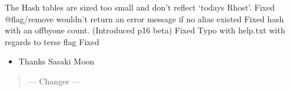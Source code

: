 \documentclass[letterpaper,10pt,english]{sphinxmanual}
\begin{document}
\sphinxAtStartPar
The Hash tables are sized too small and don’t reflect ‘todays Rhost’.  \sphinxhyphen{} Fixed
@flag/remove wouldn’t return an error message if no alias existed \sphinxhyphen{} Fixed
hash with an off\sphinxhyphen{}by\sphinxhyphen{}one count. (Introduced p16 beta) \sphinxhyphen{} Fixed
Typo with help.txt with regards to terse flag \sphinxhyphen{} Fixed
\begin{itemize}
\item {} 
\sphinxAtStartPar
Thanks Sasaki  Moon

\end{itemize}
\begin{quote}

\sphinxAtStartPar
—\sphinxhyphen{} Changes —\sphinxhyphen{}
\end{quote}
\end{document}
